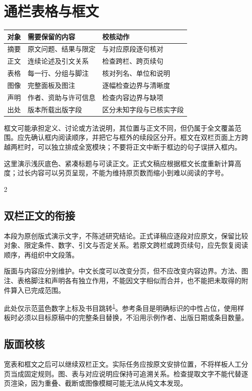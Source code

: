 \documentclass[UTF8,fontset=none,scheme=plain]{ctexart}
\newcommand{\MethodsCite}[1]{\textsuperscript{\hyperlink{ref:#1}{#1}}}
\newenvironment{methodscols}{\begin{multicols}{2}}{\end{multicols}}
\newcommand{\NeutralBody}{%
本段为原创版式演示文字，不陈述研究结论。正式译稿应逐段对应原文，保留比较对象、限定条件、数字、引文与否定关系。若原文跨栏或跨页续句，应先恢复阅读顺序，再组织中文段落。

版面与内容应分别维护。中文长度可以改变分页，但不应改变内容边界。方法、图注、表格脚注和声明各有独立作用，不能因文字相似而合并，也不能把未取得的附件算入已完成范围。

此处仅示范蓝色数字上标及书目跳转\MethodsCite{1}。参考条目是明确标识的中性占位，使用样板时必须以目标原稿中的完整条目替换，不沿用示例作者、出版日期或条目数量。
}
\begin{document}
\section*{通栏表格与框文}
\par\vspace{4bp}
{\sffamily\fontsize{8.3bp}{11.3bp}\selectfont\setlength{\tabcolsep}{7bp}
\noindent\begin{tabular}{@{}p{}p{}p{}@{}}
\toprule
对象 & 需要保留的内容 & 校核动作\\\midrule
摘要 & 原文问题、结果与限定 & 与对应原段逐句核对\\[5bp]
正文 & 连续论述及引文关系 & 检查跨栏、跨页续句\\[5bp]
表格 & 每一行、分组与脚注 & 核对列名、单位和说明\\[5bp]
图像 & 完整面板及图注 & 逐幅检查边界与清晰度\\[5bp]
声明 & 作者、资助与许可信息 & 检查内容边界与缺项\\[5bp]
出处 & 版本所载出版字段 & 区分未知字段与已核实字段\\
\bottomrule
\end{tabular}}
\par{}\par\vspace{15bp}
\begingroup\setlength{\fboxsep}{10bp}
\noindent\colorbox{MethodsBox}{\begin{minipage}{\dimexpr\textwidth-20bp\relax}
\par\smallskip
\normalfont\fontsize{8.6bp}{11.6bp}\selectfont
框文可能承担定义、讨论或方法说明，其位置与正文不同，但仍属于全文覆盖范围。应先确认框内阅读顺序，并把它与框外的续段区分开。框文在双栏页面上方跨越两栏时，可以独立排成全宽模块；不要将正文中断于框边的句子误拼入框内。

这里演示浅灰底色、紧凑标题与可读正文。正式文稿应根据框文长度重新计算高度；过长内容可以另页呈现，不能为维持原页数而缩小到难以阅读的字号。
\end{minipage}}
\endgroup\par\vspace{13bp}
\begin{methodscols}
\subsection*{双栏正文的衔接}
\NeutralBody
\subsection*{版面校核}
宽表和框文之后可以继续双栏正文。实际任务应按原文安排位置，不将样板人工分页当成固定规则。图、表与对应说明应保持可追溯关系。检查提取文字不能代替逐页渲染，因为重叠、截断或图像模糊可能无法从纯文本发现。
\end{methodscols}
\end{document}
